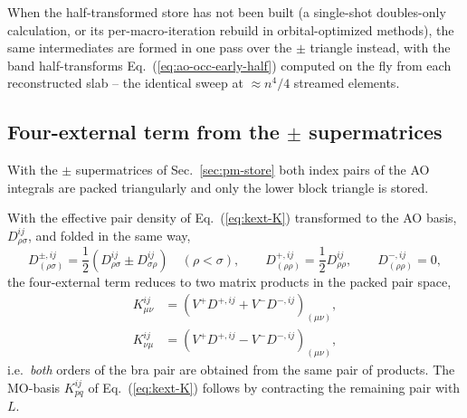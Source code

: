 \documentclass[a4paper,12pt,oneside]{book}
\newcommand{\half}{\frac{1}{2}}
\newcommand{\eq}[1]{Eq.~(\ref{#1})}
\begin{document}
When the half-transformed store has not been built (a single-shot doubles-only calculation, or its
per-macro-iteration rebuild in orbital-optimized methods), the same intermediates are formed in one
pass over the $\pm$ triangle instead, with the band half-transforms \eq{eq:ao-occ-early-half}
computed on the fly from each reconstructed slab -- the identical sweep at $\approx n^4/4$
streamed elements.

\subsection{Four-external term from the $\pm$ supermatrices} \label{sec:pm-supermatrix-use}
With the $\pm$ supermatrices of Sec.~\ref{sec:pm-store} both index pairs of the AO
integrals are packed triangularly and only the lower block triangle is stored.

With the effective pair density of \eq{eq:kext-K} transformed to the AO basis, $D^{ij}_{\rho\sigma}$,
and folded in the same way,
\begin{equation}
\label{eq:pm-density}
D^{\pm,ij}_{(\rho\sigma)} = \half\left(D^{ij}_{\rho\sigma} \pm D^{ij}_{\sigma\rho}\right)\quad(\rho\lt\sigma),
\qquad D^{+,ij}_{(\rho\rho)} = \half D^{ij}_{\rho\rho},\qquad D^{-,ij}_{(\rho\rho)} = 0,
\end{equation}
the four-external term reduces to two matrix products in the packed pair space,
\begin{equation}
\label{eq:pm-kext}
\begin{aligned}
K^{ij}_{\mu\nu} &= \left(V^{+}D^{+,ij} + V^{-}D^{-,ij}\right)_{(\mu\nu)},\\
K^{ij}_{\nu\mu} &= \left(V^{+}D^{+,ij} - V^{-}D^{-,ij}\right)_{(\mu\nu)},
\end{aligned}
\end{equation}
i.e.\ \emph{both} orders of the bra pair are obtained from the same pair of products. The MO-basis
$K^{ij}_{pq}$ of \eq{eq:kext-K} follows by contracting the remaining pair with $L$.
\end{document}

